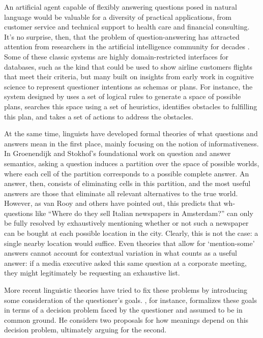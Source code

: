\documentclass[12pt, floatsintext, jou]{apa6}
\begin{document}
An artificial agent capable of flexibly answering questions posed in natural language would be valuable for a diversity of practical applications, from customer service and technical support to health care and financial consulting. It's no surprise, then, that the problem of question-answering has attracted attention from researchers in the artificial intelligence community for decades \cite{Simmons65_QuestionsComputer, Lehnert77_QuestionAnswering, AllenPerrault80_IntentionUtterances, GreenCarberry94_IndirectAnswersModel, MollaVicedo07_QARestrictedDomains}. Some of these classic systems are highly domain-restricted interfaces for databases, such as the kind that could be used to show airline customers flights that meet their criteria, but many built on insights from early work in cognitive science to represent questioner intentions as schemas or plans. For instance, the system designed by  uses a set of logical rules to generate a space of possible plans, searches this space using a set of heuristics, identifies obstacles to fulfilling this plan, and takes a set of actions to address the obstacles. 

At the same time, linguists have developed formal theories of what questions and answers mean in the first place, mainly focusing on the notion of informativeness. In Groenendijk and Stokhof's \citeyear{GroenendijkStokhof84_SemanticsOfQuestions} foundational work on question and answer semantics, asking a question induces a partition over the space of possible worlds, where each cell of the partition corresponds to a possible complete answer. An answer, then, consists of eliminating cells in this partition, and the most useful answers are those that eliminate all relevant alternatives to the true world. However, as van Rooy \citeyear{VanRooy03_QuestioningDecisionProblems} and others \cite{Ginzburg95_ResolvingQuestions} have pointed out, this predicts that wh-questions like ``Where do they sell Italian newspapers in Amsterdam?'' can only be fully resolved by exhaustively mentioning whether or not such a newspaper can be bought at each possible location in the city. Clearly, this is not the case: a single nearby location would suffice. Even theories that allow for `mention-some' answers cannot account for contextual variation in what counts as a useful answer: if a media executive asked this same question at a corporate meeting, they might legitimately be requesting an exhaustive list.

More recent linguistic theories have tried to fix these problems by introducing some consideration of the questioner's goals. , for instance, formalizes these goals in terms of a decision problem faced by the questioner and assumed to be in common ground. He considers two proposals for how meanings depend on this decision problem, ultimately arguing for the second. 
\end{document}
